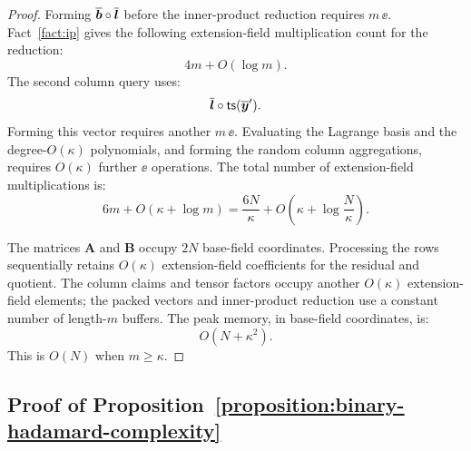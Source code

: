 \begin{proof}
Forming
\(\overline{\bm b}\circ\overline{\bm l}\) before the inner-product
reduction requires \(m\,\ee\). Fact~\ref{fact:ip} gives the
following extension-field multiplication count for the reduction:
\[
    4m+O(\log m).
\]
The second column query uses:
\[
    \overline{\bm l}
    \circ
    {\sf ts}(\overline{\bm y}').
\]
Forming this vector requires another \(m\,\ee\).
Evaluating the Lagrange basis and the degree-\(O(\kappa)\)
polynomials, and forming the random column aggregations, requires
\(O(\kappa)\) further \(\ee\) operations. The total number
of extension-field multiplications is:
\[
    6m+O(\kappa+\log m)
    =
    \frac{6N}{\kappa}
    +
    O\left(
        \kappa+\log\frac{N}{\kappa}
    \right).
\]

The matrices \(\bm A\) and \(\bm B\) occupy \(2N\) base-field
coordinates. Processing the rows sequentially retains
\(O(\kappa)\) extension-field coefficients for the residual and
quotient. The column claims and tensor factors occupy another
\(O(\kappa)\) extension-field elements; the packed vectors and
inner-product reduction use a constant number of length-\(m\)
buffers. The peak memory, in base-field coordinates, is:
\[
    O(N+\kappa^2).
\]
This is \(O(N)\) when \(m\geq\kappa\).
\end{proof}

\subsection{Proof of Proposition~\ref{proposition:binary-hadamard-complexity}}
\label{appx:proof-binary-hadamard}

